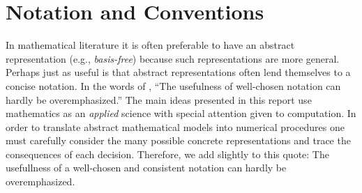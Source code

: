 
    \label{app:notation}

\section{Notation and Conventions}

    In mathematical literature it is often preferable to have
    an abstract representation (e.g., \emph{basis-free}) because such representations
    are more general. Perhaps just as useful is that abstract representations
    often lend themselves to a concise notation. 
    In the words of \citep[p. 60]{Munkres:AoM}, ``The usefulness of well-chosen
    notation can hardly be overemphasized.''
    The main ideas presented in this report use mathematics as an \emph{applied}
    science with special attention given to computation. In order
    to translate abstract mathematical models into numerical
    procedures one must carefully consider the many possible
    concrete representations and trace the consequences of each
    decision. Therefore, we add slightly to this quote:
    The usefullness of a well-chosen and consistent notation
    can hardly be overemphasized.

